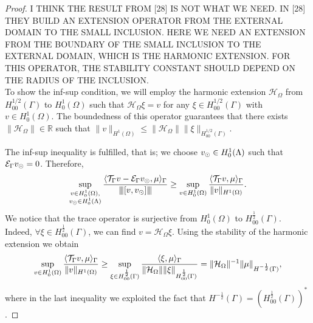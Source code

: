 \documentclass[r]{siamart171218}
\newcommand{\fede}[1]{{\color{green!55!blue}#1}}
\begin{document}
\begin{proof}
\fede{I THINK THE RESULT FROM [28] IS NOT WHAT WE NEED. IN [28] THEY BUILD AN EXTENSION OPERATOR FROM THE EXTERNAL DOMAIN TO THE SMALL INCLUSION. HERE WE NEED AN EXTENSION FROM THE BOUNDARY OF THE SMALL INCLUSION TO THE EXTERNAL DOMAIN, WHICH IS THE HARMONIC EXTENSION. FOR THIS OPERATOR, THE STABILITY CONSTANT SHOULD DEPEND ON THE RADIUS OF THE INCLUSION. \\

To show the inf-sup condition, we will employ the harmonic extension $\mathcal{H}_\Omega$ from $H^{1/2}_{00}(\Gamma)$ to $H^1_0(\Omega)$ such that $\mathcal{H}_\Omega \xi = v$ for any $\xi \in H^{1/2}_{00}(\Gamma)$ with $v\in H^1_0(\Omega)$. The boundedness of this operator guarantees that there exists 
$\| \mathcal{H}_\Omega \| \in \mathbb{R}$ such that
$\|v \|_{H^1(\Omega)}\leq \|\mathcal{H}_\Omega\| \|\xi \|_{H^{1/2}_{00}(\Gamma)}$.}

The inf-sup inequality is fulfilled, that is; 
we choose $v_{\odot} \in H^1_0(\Lambda)$ such that $\mathcal{E}_\Gamma v_{\odot} =0$. Therefore,
\begin{equation*}
\sup _{\substack{v\in H^1_0(\Omega),\\ v_{\odot} \in H^1_0(\Lambda)}} \frac{ \langle {\mathcal{T}_\Gamma} v  - \mathcal{E}_\Gamma v_{\odot}, \mu\rangle_\Gamma}{{\left\vert\kern-0.25ex\left\vert\kern-0.25ex\left\vert [v, v_{\odot}] \right\vert\kern-0.25ex\right\vert\kern-0.25ex\right\vert}} 
\geq \sup _{v\in H^1_0(\Omega)} \frac{ \langle {\mathcal{T}_\Gamma} v, \mu \rangle_\Gamma}{\|v\|_{H^1(\Omega)}}.
\end{equation*}
We notice that the trace operator is surjective from $H^1_0(\Omega)$ to $H^{\frac12}_{00}(\Gamma)$. Indeed, $\forall \xi \in H^{\frac 12}_{00}(\Gamma)$, 
we  can find $v=\mathcal{H}_\Omega \xi$. Using the stability of the harmonic extension we obtain
\begin{equation}\label{infsup_traceop}
\sup _{v\in H^1_0(\Omega)} \frac{ \langle \trace v, \mu \rangle_\Gamma}{\|v\|_{H^1(\Omega)}}
\geq  \sup _{\xi \in H^{\frac 12}_{00}(\Gamma )} \frac{ \langle \xi , \mu \rangle_\Gamma}{\|\mathcal{H}_\Omega\| \|\xi\|_{H^{\frac 12}_{00}(\Gamma)}}
= \|\mathcal{H}_\Omega\|^{-1} \|\mu\|_{H^{-\frac 12}(\Gamma)},
\end{equation}
where in the last inequality we exploited the fact that $H^{-\frac 12}(\Gamma)=(H^{\frac 12 }_{00}(\Gamma))^*$. 
\end{proof}
\end{document}
